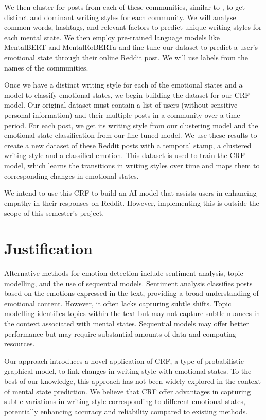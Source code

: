 \documentclass[conference,compsoc]{IEEEtran}
\begin{document}
We then cluster for posts from each of these communities, similar to \citet{Park+18:mental-health-reddit}, to get distinct and dominant writing styles for each community. We will analyse common words, hashtags, and relevant factors to predict unique writing styles for each mental state. We then employ pre-trained language models like MentalBERT and MentalRoBERTa \citep{Ji+21:MentalBERT} and fine-tune our dataset to predict a user's emotional state through their online Reddit post. We will use labels from the names of the communities. 

Once we have a distinct writing style for each of the emotional states and a model to classify emotional states, we begin building the dataset for our CRF model. Our original dataset must contain a list of users (without sensitive personal information) and their multiple posts in a community over a time period. For each post, we get its writing style from our clustering model and the emotional state classification from our fine-tuned model. We use these results to create a new dataset of these Reddit posts with a temporal stamp, a clustered writing style and a classified emotion. This dataset is used to train the CRF model, which learns the transitions in writing styles over time and maps them to corresponding changes in emotional states. 

We intend to use this CRF to build an AI model that assists users in enhancing empathy in their responses on Reddit. However, implementing this is outside the scope of this semester's project. 

\section{Justification}
Alternative methods for emotion detection include sentiment analysis, topic modelling, and the use of sequential models. Sentiment analysis classifies posts based on the emotions expressed in the text, providing a broad understanding of emotional content. However, it often lacks capturing subtle shifts. Topic modelling identifies topics within the text but may not capture subtle nuances in the context associated with mental states. Sequential models may offer better performance but may require substantial amounts of data and computing resources.

Our approach introduces a novel application of CRF, a type of probabilistic graphical model, to link changes in writing style with emotional states. To the best of our knowledge, this approach has not been widely explored in the context of mental state prediction. We believe that CRF offer advantages in capturing subtle variations in writing style corresponding to different emotional states, potentially enhancing accuracy and reliability compared to existing methods.
\end{document}
